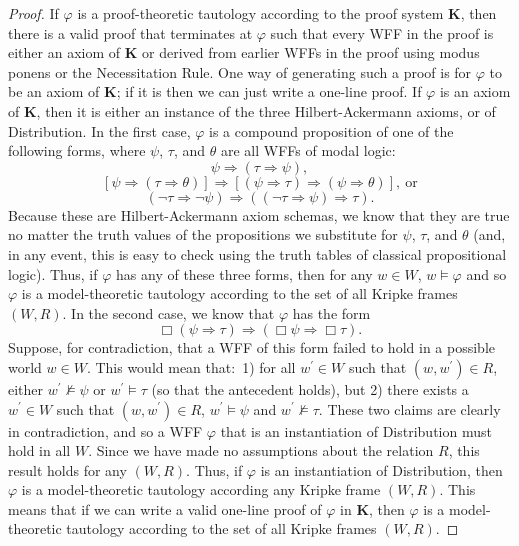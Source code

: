 \documentclass[11pt]{article}
\theoremstyle{definition}
\theoremstyle{remark}
\begin{document}
\begin{proof}
    If $\varphi$ is a proof-theoretic tautology according to the proof system \textbf{K}, then there is a valid proof that terminates at $\varphi$ such that every WFF in the proof is either an axiom of \textbf{K} or derived from earlier WFFs in the proof using modus ponens or the Necessitation Rule. One way of generating such a proof is for $\varphi$ to be an axiom of \textbf{K}; if it is then we can just write a one-line proof. If $\varphi$ is an axiom of \textbf{K}, then it is either an instance of the three Hilbert-Ackermann axioms, or of Distribution. In the first case, $\varphi$ is a compound proposition of one of the following forms, where $\psi$, $\tau$, and $\theta$ are all WFFs of modal logic:
    $$\psi\Rightarrow(\tau\Rightarrow\psi),$$
    $$[\psi\Rightarrow(\tau\Rightarrow\theta)]\Rightarrow[(\psi\Rightarrow\tau)\Rightarrow(\psi\Rightarrow\theta)], \ \text{or}$$
    $$(\neg\tau \Rightarrow \neg\psi)\Rightarrow ((\neg\tau\Rightarrow \psi)\Rightarrow \tau).$$
    Because these are Hilbert-Ackermann axiom schemas, we know that they are true no matter the truth values of the propositions we substitute for $\psi$, $\tau$, and $\theta$ (and, in any event, this is easy to check using the truth tables of classical propositional logic). Thus, if $\varphi$ has any of these three forms, then for any $w\in W$, $w\vDash \varphi$ and so $\varphi$ is a model-theoretic tautology according to the set of all Kripke frames $(W,R)$. In the second case, we know that $\varphi$ has the form
    $$\Box(\psi\Rightarrow\tau)\Rightarrow(\Box\psi\Rightarrow\Box\tau).$$
    Suppose, for contradiction, that a WFF of this form failed to hold in a possible world $w\in W$. This would mean that:\ 1) for all $w^{\prime}\in W$ such that $(w,w^{\prime})\in R$, either $w^{\prime}\not\vDash\psi$ or $w^{\prime}\vDash\tau$ (so that the antecedent holds), but 2) there exists a $w^{\prime}\in W$ such that $(w,w^{\prime})\in R$, $w^{\prime}\vDash\psi$ and $w^{\prime}\not\vDash\tau$. These two claims are clearly in contradiction, and so a WFF $\varphi$ that is an instantiation of Distribution must hold in all $W$. Since we have made no assumptions about the relation $R$, this result holds for any $(W,R)$. Thus, if $\varphi$ is an instantiation of Distribution, then $\varphi$ is a model-theoretic tautology according any Kripke frame $(W,R)$. This means that if we can write a valid one-line proof of $\varphi$ in \textbf{K}, then $\varphi$ is a model-theoretic tautology according to the set of all Kripke frames $(W,R)$.\par 


\end{proof}
\end{document}
